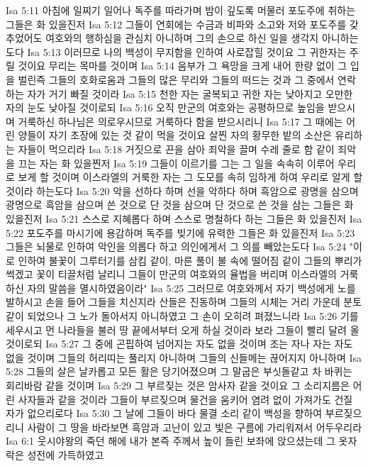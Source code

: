 Isa 5:11  아침에 일찌기 일어나 독주를 따라가며 밤이 깊도록 머물러 포도주에 취하는 그들은 화 있을진저
Isa 5:12  그들이 연회에는 수금과 비파와 소고와 저와 포도주를 갖추었어도 여호와의 행하심을 관심치 아니하며 그의 손으로 하신 일을 생각지 아니하는도다
Isa 5:13  이러므로 나의 백성이 무지함을 인하여 사로잡힐 것이요 그 귀한자는 주릴 것이요 무리는 목마를 것이며
Isa 5:14  음부가 그 욕망을 크게 내어 한량 없이 그 입을 벌린즉 그들의 호화로움과 그들의 많은 무리와 그들의 떠드는 것과 그 중에서 연락하는 자가 거기 빠질 것이라
Isa 5:15  천한 자는 굴복되고 귀한 자는 낮아지고 오만한 자의 눈도 낮아질 것이로되
Isa 5:16  오직 만군의 여호와는 공평하므로 높임을 받으시며 거룩하신 하나님은 의로우시므로 거룩하다 함을 받으시리니
Isa 5:17  그 때에는 어린 양들이 자기 초장에 있는 것 같이 먹을 것이요 살찐 자의 황무한 밭의 소산은 유리하는 자들이 먹으리라
Isa 5:18  거짓으로 끈을 삼아 죄악을 끌며 수레 줄로 함 같이 죄악을 끄는 자는 화 있을찐저
Isa 5:19  그들이 이르기를 그는 그 일을 속속히 이루어 우리로 보게 할 것이며 이스라엘의 거룩한 자는 그 도모를 속히 임하게 하여 우리로 알게 할 것이라 하는도다
Isa 5:20  악을 선하다 하며 선을 악하다 하며 흑암으로 광명을 삼으며 광명으로 흑암을 삼으며 쓴 것으로 단 것을 삼으며 단 것으로 쓴 것을 삼는 그들은 화 있을진저
Isa 5:21  스스로 지혜롭다 하며 스스로 명철하다 하는 그들은 화 있을진저
Isa 5:22  포도주를 마시기에 용감하며 독주를 빚기에 유력한 그들은 화 있을진저
Isa 5:23  그들은 뇌물로 인하여 악인을 의롭다 하고 의인에게서 그 의를 빼았는도다
Isa 5:24  "이로 인하여 불꽃이 그루터기를 삼킴 같이, 마른 풀이 불 속에 떨어짐 같이 그들의 뿌리가 썩겠고 꽃이 티끌처럼 날리니 그들이 만군의 여호와의 율법을 버리며 이스라엘의 거룩하신 자의 말씀을 멸시하였음이라"
Isa 5:25  그러므로 여호와께서 자기 백성에게 노를 발하시고 손을 들어 그들을 치신지라 산들은 진동하며 그들의 시체는 거리 가운데 분토같이 되었으나 그 노가 돌아서지 아니하였고 그 손이 오히려 펴졌느니라
Isa 5:26  기를 세우시고 먼 나라들을 불러 땅 끝에서부터 오게 하실 것이라 보라 그들이 빨리 달려 올 것이로되
Isa 5:27  그 중에 곤핍하여 넘어지는 자도 없을 것이며 조는 자나 자는 자도 없을 것이며 그들의 허리띠는 풀리지 아니하며 그들의 신들메는 끊어지지 아니하며
Isa 5:28  그들의 살은 날카롭고 모든 활은 당기어졌으며 그 말굽은 부싯돌같고 차 바퀴는 회리바람 같을 것이며
Isa 5:29  그 부르짖는 것은 암사자 같을 것이요 그 소리지름은 어린 사자들과 같을 것이라 그들이 부르짖으며 물건을 움키어 염려 없이 가져가도 건질 자가 없으리로다
Isa 5:30  그 날에 그들이 바다 물결 소리 같이 백성을 향하여 부르짖으리니 사람이 그 땅을 바라보면 흑암과 고난이 있고 빛은 구름에 가리워져서 어두우리라
Isa 6:1  웃시야왕의 죽던 해에 내가 본즉 주께서 높이 들린 보좌에 앉으셨는데 그 옷자락은 성전에 가득하였고
